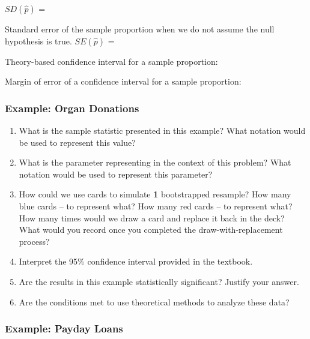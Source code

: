\documentclass[
]{report}
\newcommand{\rgs}{\vspace{12pt}} %
\begin{document}
\(SD(\hat{p})\) =
\rgs

Standard error of the sample proportion when we do not assume the null hypothesis is true.
\(SE(\hat{p})\) =
\rgs

Theory-based confidence interval for a sample proportion:
\rgs

Margin of error of a confidence interval for a sample proportion:
\rgs

\hypertarget{example-organ-donations-1}{%
\subsubsection*{Example: Organ Donations}\label{example-organ-donations-1}}

\begin{enumerate}
\def\labelenumi{\arabic{enumi}.}
\item
  What is the sample statistic presented in this example? What notation would be used to represent this value?
  \rgs
\item
  What is the parameter representing in the context of this problem? What notation would be used to represent this parameter?
  \rgs
\item
  How could we use cards to simulate \textbf{1} bootstrapped resample? How many blue cards -- to represent what? How many red cards -- to represent what? How many times would we draw a card and replace it back in the deck? What would you record once you completed the draw-with-replacement process?
  \rgs
  \rgs
\item
  Interpret the 95\% confidence interval provided in the textbook.
  \rgs
\item
  Are the results in this example statistically significant? Justify your answer.
  \rgs
\item
  Are the conditions met to use theoretical methods to analyze these data?
  \rgs
\end{enumerate}

\hypertarget{example-payday-loans-1}{%
\subsubsection*{Example: Payday Loans}\label{example-payday-loans-1}}
\end{document}
